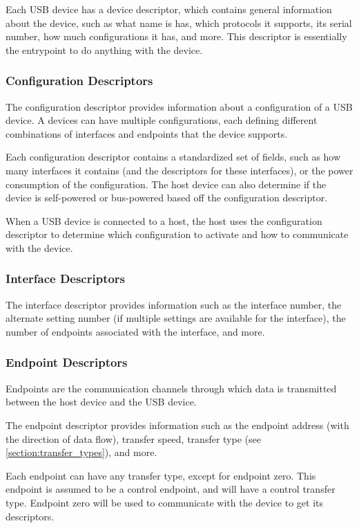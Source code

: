 Each USB device has a device descriptor, which contains general information about the device, such as what name is has, which protocols it supports, its serial number, how much configurations it has, and more. This descriptor is essentially the entrypoint to do anything with the device.

\subsubsection{Configuration Descriptors}

The configuration descriptor provides information about a configuration of a USB device. A devices can have multiple configurations, each defining different combinations of interfaces and endpoints that the device supports.

Each configuration descriptor contains a standardized set of fields, such as how many interfaces it contains (and the descriptors for these interfaces), or the power consumption of the configuration. The host device can also determine if the device is self-powered or bus-powered based off the configuration descriptor.

When a USB device is connected to a host, the host uses the configuration descriptor to determine which configuration to activate and how to communicate with the device.

\subsubsection{Interface Descriptors}

The interface descriptor provides information such as the interface number, the alternate setting number (if multiple settings are available for the interface), the number of endpoints associated with the interface, and more.

\subsubsection{Endpoint Descriptors}

Endpoints are the communication channels through which data is transmitted between the host device and the USB device.

The endpoint descriptor provides information such as the endpoint address (with the direction of data flow), transfer speed, transfer type (see \ref{section:transfer_types}), and more.

Each endpoint can have any transfer type, except for endpoint zero. This endpoint is assumed to be a control endpoint, and will have a control transfer type. Endpoint zero will be used to communicate with the device to get its descriptors.

